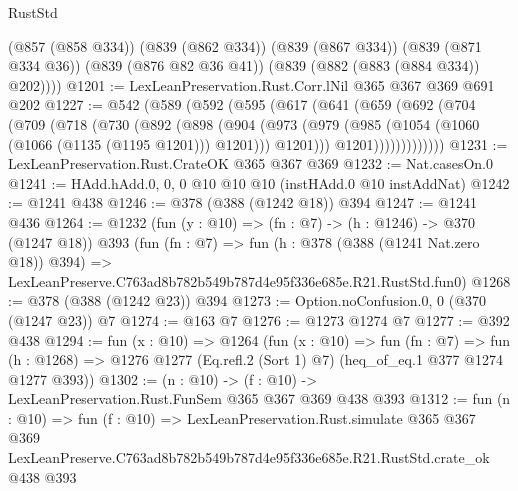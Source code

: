 \begin{lexlean}{RustStd}
\begin{coremodule}
        (@857 (@858 @334))
        (@839 (@862 @334))
        (@839 (@867 @334))
        (@839 (@871 @334 @36))
        (@839 (@876 @82 @36 @41))
        (@839 (@882 (@883 (@884 @334)) @202))))
@1201 := LexLeanPreservation.Rust.Corr.lNil @365 @367 @369 @691 @202
@1227 := @542
    (@589
      (@592
        (@595
          (@617
            (@641
              (@659
                (@692
                  (@704
                    (@709
                      (@718
                        (@730
                          (@892
                            (@898
                              (@904
                                (@973
                                  (@979
                                    (@985 (@1054 (@1060 (@1066 (@1135 (@1195 @1201))) @1201)))
                                    @1201)))
                              @1201)))))))))))))
@1231 := LexLeanPreservation.Rust.CrateOK @365 @367 @369
@1232 := Nat.casesOn.{0}
@1241 := HAdd.hAdd.{0, 0, 0} @10 @10 @10 (instHAdd.{0} @10 instAddNat)
@1242 := @1241 @438
@1246 := @378 (@388 (@1242 @18)) @394
@1247 := @1241 @436
@1264 := @1232
    (fun (y : @10) => (fn : @7) -> (h : @1246) -> @370 (@1247 @18))
    @393
    (fun (fn : @7) =>
    fun (h : @378 (@388 (@1241 Nat.zero @18)) @394) =>
    LexLeanPreserve.C763ad8b782b549b787d4e95f336e685e.R21.RustStd.fun0)
@1268 := @378 (@388 (@1242 @23)) @394
@1273 := Option.noConfusion.{0, 0} (@370 (@1247 @23)) @7
@1274 := @163 @7
@1276 := @1273 @1274 @7
@1277 := @392 @438
@1294 := fun (x : @10) =>
  @1264
    (fun (x : @10) =>
    fun (fn : @7) =>
    fun (h : @1268) => @1276 @1277 (Eq.refl.{2} (Sort 1) @7) (heq_of_eq.{1} @377 @1274 @1277 @393))
@1302 := (n : @10) -> (f : @10) -> LexLeanPreservation.Rust.FunSem @365 @367 @369 @438 @393
@1312 := fun (n : @10) =>
  fun (f : @10) =>
  LexLeanPreservation.Rust.simulate
    @365
    @367
    @369
    LexLeanPreserve.C763ad8b782b549b787d4e95f336e685e.R21.RustStd.crate_ok
    @438
    @393
\end{coremodule}
\end{lexlean}
